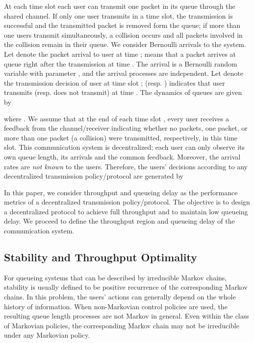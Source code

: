 \documentclass[onecolumn,draftcls]{IEEEtran}
\begin{document}
At each time slot  each user can transmit one packet in its queue through the shared channel.
If only one user transmits in a time slot, the transmission is successful and the transmitted packet is removed form the queue; if more than one users transmit simultaneously, a collision occurs and all packets involved in the collision remain in their queue.
We consider Bernoulli arrivals to the system.
Let  denote the packet arrival to user  at time ;
 means that a packet arrives at queue  right after the transmission at time .
The arrival  is a Bernoulli random variable with parameter , and the
arrival processes
 are independent.
Let  denote the transmission decision of user  at time slot ;  (resp. ) indicates that user  transmits (resp. does not transmit) at time . 
The dynamics of queues are given by

where .
We assume that at the end of each time slot , every user receives a feedback  from the channel/receiver indicating whether no packets, one packet, or more than one packet (a collision) were transmitted, respectively, in this time slot.
This communication system is decentralized; each user can only observe its own queue length, its arrivals and the common feedback.
Moreover, the arrival rates  are \textit{not known} to the users.
Therefore, the users' decisions according to any decentralized transmission policy/protocol  are generated by



In this paper, we consider throughput and queueing delay as the performance metrics of a decentralized transmission policy/protocol.
The objective is to design a decentralized protocol to achieve full throughput and to maintain low queueing delay. We proceed to define the throughput region and queueing delay of the communication system.


\subsection{Stability and Throughput Optimality}\label{sub:model:throughput}


For queueing systems that can be described by irreducible Markov chains,
stability is usually defined to be positive recurrence of the corresponding Markov chains.
In this problem, the users' actions can generally depend on the whole history of information.
When non-Markovian control policies are used, the resulting queue length processes are not Markov in general.
Even within the class of Markovian policies, the corresponding Markov chain may not be irreducible under any Markovian policy.
\end{document}
